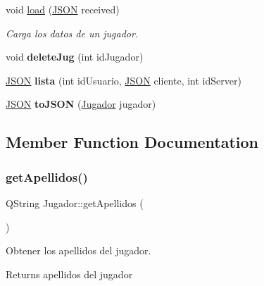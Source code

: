 \begin{DoxyCompactItemize}
void \mbox{\hyperlink{classJugador_ae2da8cec1afc1c566872dcc27f41e955}{load}} (\mbox{\hyperlink{jugador_8h_ab6104b89642419db4e355b7b2e40abbe}{J\+S\+ON}} received)
\begin{DoxyCompactList}\small\item\em Carga los datos de un jugador. \end{DoxyCompactList}\item 
\mbox{\label{classJugador_ab745fba278bbf9d750db5fb31ff49842}} 
void {\bfseries delete\+Jug} (int id\+Jugador)
\item 
\mbox{\label{classJugador_a0c7e8a139b10c0b077a553568f407057}} 
\mbox{\hyperlink{jugador_8h_ab6104b89642419db4e355b7b2e40abbe}{J\+S\+ON}} {\bfseries lista} (int id\+Usuario, \mbox{\hyperlink{jugador_8h_ab6104b89642419db4e355b7b2e40abbe}{J\+S\+ON}} cliente, int id\+Server)
\item 
\mbox{\label{classJugador_afa093cf63f9a65ed527f3da6431271d2}} 
\mbox{\hyperlink{jugador_8h_ab6104b89642419db4e355b7b2e40abbe}{J\+S\+ON}} {\bfseries to\+J\+S\+ON} (\mbox{\hyperlink{classJugador}{Jugador}} jugador)
\end{DoxyCompactItemize}


\subsection{Member Function Documentation}
\mbox{\label{classJugador_aba79aff8e870ffe04bf5a4ffd94f5e5d}} 
\subsubsection{\texorpdfstring{get\+Apellidos()}{getApellidos()}}
{\footnotesize\ttfamily Q\+String Jugador\+::get\+Apellidos (\begin{DoxyParamCaption}{ }\end{DoxyParamCaption})}



Obtener los apellidos del jugador. 

\begin{DoxyReturn}{Returns}
apellidos del jugador 
\end{DoxyReturn}
\mbox{\label{classJugador_abd65250f237f645c3f926e879b4740dd}} 
